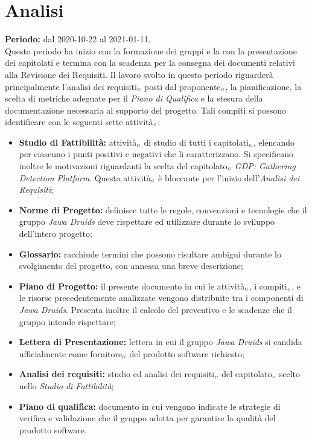 \section{Analisi}\label{PianificazioneAnalisi}
\textbf{Periodo:} dal 2020-10-22 al 2021-01-11.\\
Questo periodo ha inizio con la formazione dei gruppi e la con la presentazione dei capitolati e termina con la scadenza per la consegna dei documenti relativi alla Revisione dei Requisiti.
Il lavoro svolto in questo periodo riguarderà principalmente l'analisi dei requisiti$_{\scaleto{G}{3pt}}$ posti dal proponente$_{\scaleto{G}{3pt}}$, la pianificazione, la scelta di metriche adeguate per il \textit{Piano di Qualifica} e la stesura della documentazione necessaria al supporto del progetto.
Tali compiti si possono identificare con le seguenti sette attività$_{\scaleto{G}{3pt}}$:
\begin{itemize}
	\item \textbf{Studio di Fattibilità:} attività$_{\scaleto{G}{3pt}}$ di studio di tutti i capitolati$_{\scaleto{G}{3pt}}$, elencando per ciascuno i punti positivi e negativi che li caratterizzano. Si specificano inoltre le motivazioni riguardanti la scelta del capitolato$_{\scaleto{G}{3pt}}$ \textit{GDP: Gathering Detection Platform}.
	Questa attività$_{\scaleto{G}{3pt}}$ è bloccante per l'inizio dell'\textit{Analisi dei Requisiti};
	\item \textbf{Norme di Progetto:} definisce tutte le regole, convenzioni e tecnologie che il gruppo \textit{Jawa Druids} deve rispettare ed utilizzare durante lo sviluppo dell'intero progetto;
	\item \textbf{Glossario:} racchiude termini che possono risultare ambigui durante lo svolgimento del progetto, con annessa una breve descrizione;
	\item \textbf{Piano di Progetto:} il presente documento in cui le attività$_{\scaleto{G}{3pt}}$, i compiti$_{\scaleto{G}{3pt}}$, e le risorse precedentemente analizzate vengono distribuite tra i componenti di \textit{Jawa Druids}. Presenta inoltre il calcolo del preventivo e le scadenze che il gruppo intende rispettare;
	\item \textbf{Lettera di Presentazione:} lettera in cui il gruppo \textit{Jawa Druids} si candida ufficialmente come fornitore$_{\scaleto{G}{3pt}}$ del prodotto software richiesto;
	\item \textbf{Analisi dei requisiti:} studio ed analisi dei requisiti$_{\scaleto{G}{3pt}}$ del capitolato$_{\scaleto{G}{3pt}}$ scelto nello \textit{Studio di Fattibilità};
	\item \textbf{Piano di qualifica:} documento in cui vengono indicate le strategie di verifica e validazione che il gruppo adotta per garantire la qualità del prodotto software.
\end{itemize}
